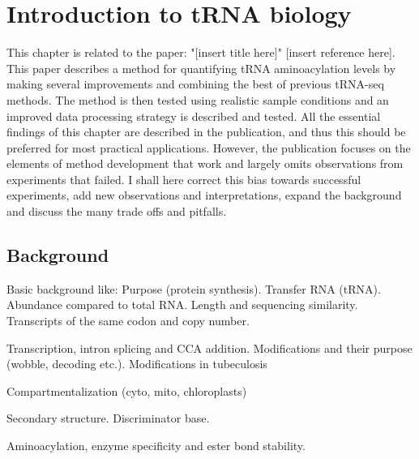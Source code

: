 \chapter{Introduction to tRNA biology}
\label{chap4}


This chapter is related to the paper: "[insert title here]" [insert reference here].
This paper describes a method for quantifying tRNA aminoacylation levels by making several improvements and combining the best of previous tRNA-seq methods.
The method is then tested using realistic sample conditions and an improved data processing strategy is described and tested.
All the essential findings of this chapter are described in the publication, and thus this should be preferred for most practical applications.
However, the publication focuses on the elements of method development that work and largely omits observations from experiments that failed.
I shall here correct this bias towards successful experiments, add new observations and interpretations, expand the background and discuss the many trade offs and pitfalls.


\section{Background}
Basic background like:
Purpose (protein synthesis).
Transfer RNA (tRNA).
Abundance compared to total RNA.
Length and sequencing similarity.
Transcripts of the same codon and copy number.

Transcription, intron splicing and CCA addition.
Modifications and their purpose (wobble, decoding etc.).
Modifications in tubeculosis \cite{Tomasi2023-wg}

Compartmentalization (cyto, mito, chloroplasts)

Secondary structure.
Discriminator base.

Aminoacylation, enzyme specificity and ester bond stability.



